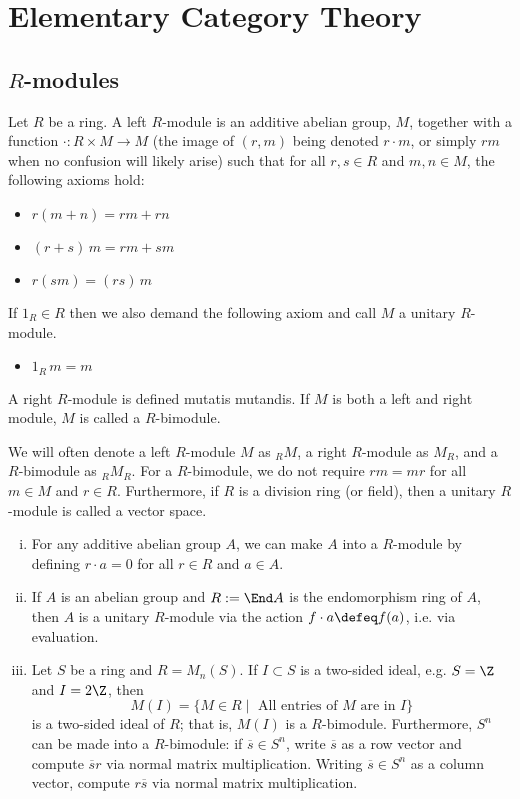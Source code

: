 \newpage
\section{Elementary Category Theory}
\subsection{$R$-modules}


\begin{dfn}[$R$-module]
Let $R$ be a ring. A left $R$-module is an additive abelian group, $M$, together with a function $\cdot: R \times M \rightarrow M$ (the image of $(r,m)$ being denoted $r\cdot m$, or simply $rm$ when no confusion will likely arise) such that for all $r,s \in R$ and $m,n \in M$, the following axioms hold:
	\begin{itemize}
	\item $r(m+n)=rm+rn$
	\item $(r+s)\, m=rm+sm$
	\item $r(sm)=(rs)\,m$
	\end{itemize}
If $1_R \in R$ then we also demand the following axiom and call $M$ a unitary $R$-module.
	\begin{itemize}
	\item $1_R\, m=m$ 
	\end{itemize}
A right $R$-module is defined mutatis mutandis. If $M$ is both a left and right module, $M$ is called a $R$-bimodule. 
\end{dfn}


\begin{rem}
We will often denote a left $R$-module $M$ as $_{R}M$, a right $R$-module as $M_R$, and a $R$-bimodule as $_RM_R$. For a $R$-bimodule, we do not require $rm=mr$ for all $m \in M$ and $r \in R$. Furthermore, if $R$ is a division ring (or field), then a unitary $R$-module is called a vector space. 
\end{rem}


\begin{ex} \hfill
\begin{enumerate}[(i)]
\item For any additive abelian group $A$, we can make $A$ into a $R$-module by defining $r \cdot a=0$ for all $r \in R$ and $a \in A$. 

\item If $A$ is an abelian group and $R:=\End A$ is the endomorphism ring of $A$, then $A$ is a unitary $R$-module via the action $f \cdot a \defeq f(a)$, i.e. via evaluation.

\item Let $S$ be a ring and $R=M_n(S)$. If $I \subset S$ is a two-sided ideal, e.g. $S=\Z$ and $I=2\Z$, then
	\[
	M(I)=\{M \in R \;|\; \text{ All entries of }M \text{ are in }I\}
	\]
is a two-sided ideal of $R$; that is, $M(I)$ is a $R$-bimodule. Furthermore, $S^n$ can be made into a $R$-bimodule: if $\overline{s} \in S^n$, write $\overline{s}$ as a row vector and compute $\overline{s}r$ via normal matrix multiplication. Writing $\overline{s} \in S^n$ as a column vector, compute $r \overline{s}$ via normal matrix multiplication. 
\end{enumerate} \xqed
\end{ex}


